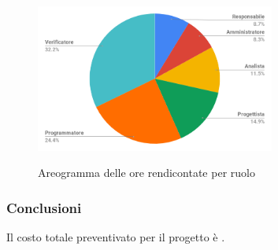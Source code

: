 \begin{figure}[H] 
			\centering 
				\includegraphics[width=0.7\textwidth]{res/images/areogramma_rendicontate.png}\\
				\caption{Areogramma delle ore rendicontate per ruolo}
			\label{AreogrammaOreRendicontate}
\end{figure}

\subsubsection{Conclusioni}
Il costo totale preventivato per il progetto è .

